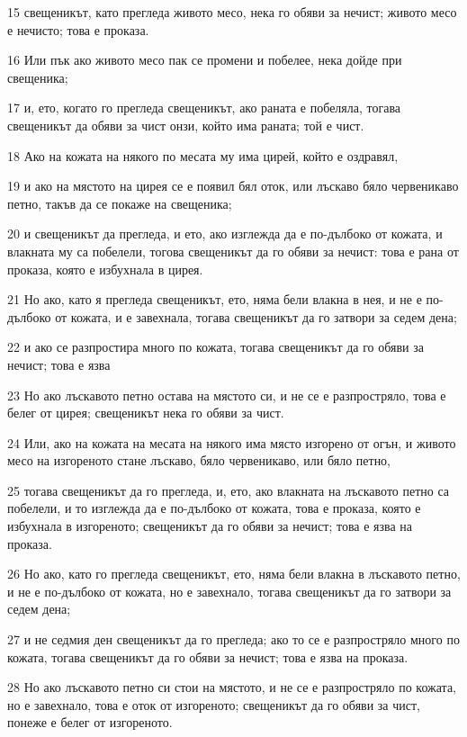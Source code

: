 \par 15 свещеникът, като прегледа живото месо, нека го обяви за нечист; живото месо е нечисто; това е проказа.
\par 16 Или пък ако живото месо пак се промени и побелее, нека дойде при свещеника;
\par 17 и, ето, когато го прегледа свещеникът, ако раната е побеляла, тогава свещеникът да обяви за чист онзи, който има раната; той е чист.
\par 18 Ако на кожата на някого по месата му има цирей, който е оздравял,
\par 19 и ако на мястото на цирея се е появил бял оток, или лъскаво бяло червеникаво петно, такъв да се покаже на свещеника;
\par 20 и свещеникът да прегледа, и ето, ако изглежда да е по-дълбоко от кожата, и влакната му са побелели, тогова свещеникът да го обяви за нечист: това е рана от проказа, която е избухнала в цирея.
\par 21 Но ако, като я прегледа свещеникът, ето, няма бели влакна в нея, и не е по-дълбоко от кожата, и е завехнала, тогава свещеникът да го затвори за седем дена;
\par 22 и ако се разпростира много по кожата, тогава свещеникът да го обяви за нечист; това е язва
\par 23 Но ако лъскавото петно остава на мястото си, и не се е разпростряло, това е белег от цирея; свещеникът нека го обяви за чист.
\par 24 Или, ако на кожата на месата на някого има място изгорено от огън, и живото месо на изгореното стане лъскаво, бяло червеникаво, или бяло петно,
\par 25 тогава свещеникът да го прегледа, и, ето, ако влакната на лъскавото петно са побелели, и то изглежда да е по-дълбоко от кожата, това е проказа, която е избухнала в изгореното; свещеникът да го обяви за нечист; това е язва на проказа.
\par 26 Но ако, като го прегледа свещеникът, ето, няма бели влакна в лъскавото петно, и не е по-дълбоко от кожата, но е завехнало, тогава свещеникът да го затвори за седем дена;
\par 27 и не седмия ден свещеникът да го прегледа; ако то се е разпростряло много по кожата, тогава свещеникът да го обяви за нечист; това е язва на проказа.
\par 28 Но ако лъскавото петно си стои на мястото, и не се е разпростряло по кожата, но е завехнало, това е оток от изгореното; свещеникът да го обяви за чист, понеже е белег от изгореното.

